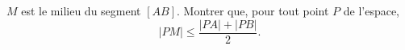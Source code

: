$M$ est le milieu du segment $[AB]$. Montrer que, pour tout point $P$ de l'espace,
\[ |PM| \leq \frac{|PA| + |PB|}{2}. \]
